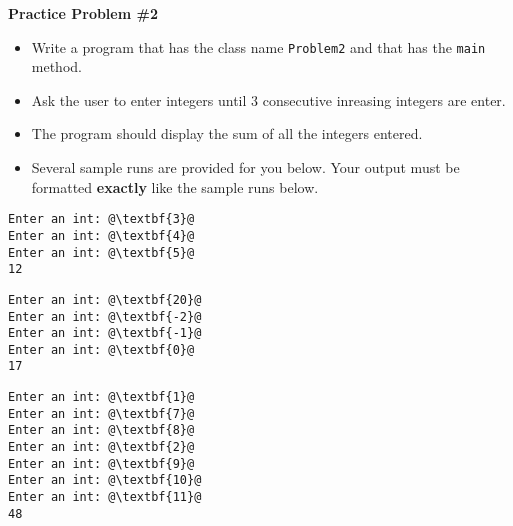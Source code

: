 \documentclass[12pt]{article}
\begin{document}
\vspace*{0.5cm}
\noindent\textbf{Practice Problem \#2}
\begin{itemize}
	\item Write a program that has the class name \texttt{Problem2} and that has the \texttt{main} method.
	\item Ask the user to enter integers until 3 consecutive inreasing integers are enter.
	\item The program should display the sum of all the integers entered.
	\item Several sample runs are provided for you below. Your output must be formatted \textbf{exactly} like the sample runs below.
\end{itemize}
\begin{center}
\begin{minipage}{3cm}
\begin{lstlisting}[escapechar=@]
Enter an int: @\textbf{3}@
Enter an int: @\textbf{4}@
Enter an int: @\textbf{5}@
12
\end{lstlisting}
\end{minipage}
\hspace*{.5cm}
\begin{minipage}{3cm}
\begin{lstlisting}[escapechar=@]
Enter an int: @\textbf{20}@
Enter an int: @\textbf{-2}@
Enter an int: @\textbf{-1}@
Enter an int: @\textbf{0}@
17
\end{lstlisting}

\end{minipage}
\hspace*{.5cm}
\begin{minipage}{3cm}
\begin{lstlisting}[escapechar=@]
Enter an int: @\textbf{1}@
Enter an int: @\textbf{7}@
Enter an int: @\textbf{8}@
Enter an int: @\textbf{2}@
Enter an int: @\textbf{9}@
Enter an int: @\textbf{10}@
Enter an int: @\textbf{11}@
48
\end{lstlisting}

\end{minipage}\\


\end{center}

\vspace*{0.5cm}
\end{document}
